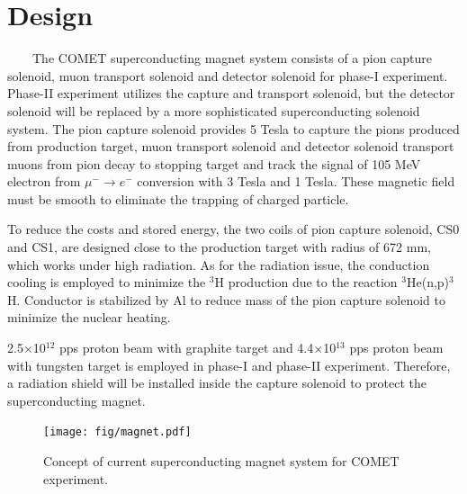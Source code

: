 \documentclass[a4paper, 10pt, twocolumn]{article}
\begin{document}
\section{Design}
~~~~The COMET superconducting magnet system consists of a pion capture solenoid, muon transport solenoid and detector solenoid for phase-I experiment.
Phase-II experiment utilizes the capture and transport solenoid, but the detector solenoid will be replaced by a more sophisticated superconducting solenoid system.
The pion capture solenoid provides 5 Tesla to capture the pions produced from production target, muon transport solenoid and detector solenoid transport muons from pion decay to stopping target and track the signal of 105 MeV electron from $\mu^- \rightarrow e^-$ conversion with 3 Tesla and 1 Tesla.
These magnetic field must be smooth to eliminate the trapping of charged particle.

To reduce the costs and stored energy, the two coils of pion capture solenoid, CS0 and CS1, are designed close to the production target with radius of 672 mm, which works under high radiation.
As for the radiation issue, the conduction cooling is employed to minimize the $^3$H production due to the reaction $^3$He(n,p)$^3$H.
Conductor is stabilized by Al to reduce mass of the pion capture solenoid to minimize the nuclear heating.

2.5$\times$10$^{12}$ pps proton beam with graphite target and 4.4$\times$10$^{13}$ pps proton beam with tungsten target is employed in phase-I and phase-II experiment.
Therefore, a radiation shield will be installed inside the capture solenoid to protect the superconducting magnet.
\begin{figure}[H]
 \centering
 \texttt{[image: fig/magnet.pdf]}
 \caption{Concept of current superconducting magnet system for COMET experiment.}
 \label{magnet}
\end{figure}
\end{document}
